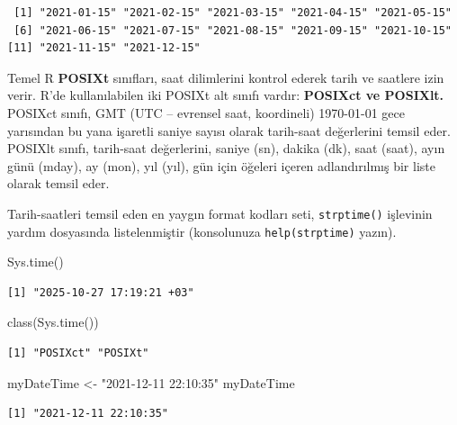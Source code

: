 \documentclass[
  letterpaper,
  DIV=11,
  numbers=noendperiod]{scrreprt}
\newenvironment{Shaded}{\begin{snugshade}}{\end{snugshade}}
\newcommand{\FunctionTok}[1]{\textcolor[rgb]{0.28,0.35,0.67}{#1}}
\newcommand{\NormalTok}[1]{\textcolor[rgb]{0.00,0.23,0.31}{#1}}
\newcommand{\OtherTok}[1]{\textcolor[rgb]{0.00,0.23,0.31}{#1}}
\newcommand{\StringTok}[1]{\textcolor[rgb]{0.13,0.47,0.30}{#1}}
\begin{document}
\begin{verbatim}
 [1] "2021-01-15" "2021-02-15" "2021-03-15" "2021-04-15" "2021-05-15"
 [6] "2021-06-15" "2021-07-15" "2021-08-15" "2021-09-15" "2021-10-15"
[11] "2021-11-15" "2021-12-15"
\end{verbatim}

Temel R \textbf{POSIXt} sınıfları, saat dilimlerini kontrol ederek tarih
ve saatlere izin verir. R'de kullanılabilen iki POSIXt alt sınıfı
vardır: \textbf{POSIXct ve POSIXlt.} POSIXct sınıfı, GMT (UTC --
evrensel saat, koordineli) 1970-01-01 gece yarısından bu yana işaretli
saniye sayısı olarak tarih-saat değerlerini temsil eder. POSIXlt sınıfı,
tarih-saat değerlerini, saniye (sn), dakika (dk), saat (saat), ayın günü
(mday), ay (mon), yıl (yıl), gün için öğeleri içeren adlandırılmış bir
liste olarak temsil eder.

Tarih-saatleri temsil eden en yaygın format kodları seti,
\texttt{strptime()} işlevinin yardım dosyasında listelenmiştir
(konsolunuza \texttt{help(strptime)} yazın).

\begin{Shaded}
\begin{Highlighting}[]
\FunctionTok{Sys.time}\NormalTok{()}
\end{Highlighting}
\end{Shaded}

\begin{verbatim}
[1] "2025-10-27 17:19:21 +03"
\end{verbatim}

\begin{Shaded}
\begin{Highlighting}[]
\FunctionTok{class}\NormalTok{(}\FunctionTok{Sys.time}\NormalTok{())}
\end{Highlighting}
\end{Shaded}

\begin{verbatim}
[1] "POSIXct" "POSIXt" 
\end{verbatim}

\begin{Shaded}
\begin{Highlighting}[]
\NormalTok{myDateTime }\OtherTok{\textless{}{-}} \StringTok{"2021{-}12{-}11 22:10:35"}
\NormalTok{myDateTime}
\end{Highlighting}
\end{Shaded}

\begin{verbatim}
[1] "2021-12-11 22:10:35"
\end{verbatim}
\end{document}
